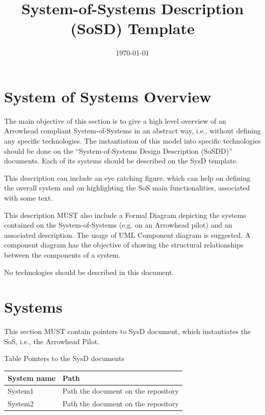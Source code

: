 \documentclass{article}
\date{\today} & 1.2 \\
\title{System-of-Systems Description (SoSD) Template}
\newcounter{Table}
\renewcommand\theTable{\arabic{Table}}
\begin{document}
\maketitle


\setcounter{tocdepth}{10}
\renewcommand\contentsname{}
\tableofcontents
\newpage

\section{System of Systems Overview}
The main objective of this section is to give a high level overview of an Arrowhead compliant System-of-Systems in an abstract way, i.e., without defining any specific technologies. The instantiation of this model into specific technologies should be done on the ``System-of-Systems Design Description (SoSDD)'' documents. Each of its systems should be described on the SysD template.

This description can include an eye catching figure, which can help on defining the overall system and on highlighting the SoS main functionalities, associated with some text.

This description MUST also include a Formal Diagram depicting the systems contained on the System-of-Systems (e.g. on an Arrowhead pilot) and an associated description. The usage of UML Component diagram is suggested. A component diagram has the objective of showing the structural relationships between the components of a system.

No technologies should be described in this document.


\section{Systems }
This section MUST contain pointers to SysD document, which instantiates the SoS, i.e., the Arrowhead Pilot.

Table \stepcounter{Table}{\theTable} Pointers to the SysD documents

\begin{flushleft}
\tablefirsthead{}
\tablehead{}
\tabletail{}
\tablelasttail{}
\begin{supertabular}{|m{1.4531599in}|m{4.47956in}|}
\hline
System name &
Path\\\hline
System1 &
Path the document on the repository\\\hline
System2 &
Path the document on the repository\\\hline
\end{supertabular}
\end{flushleft}
\end{document}
